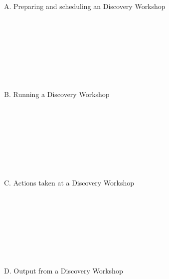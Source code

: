     \begin{framed}
        A. Preparing and scheduling an Discovery Workshop \\
           \\
           \\
           \\
           \\
           \\
           \\
           \\
           \\
        B. Running a Discovery Workshop \\
           \\
           \\
           \\
           \\
           \\
           \\
           \\
           \\
        C. Actions taken at a Discovery Workshop \\
           \\
           \\
           \\
           \\
           \\
           \\
           \\
           \\
        D. Output from a Discovery Workshop
           \\
           \\
           \\
           \\
           \\
           \\
           \\
           \\
    \end{framed}
\fi

